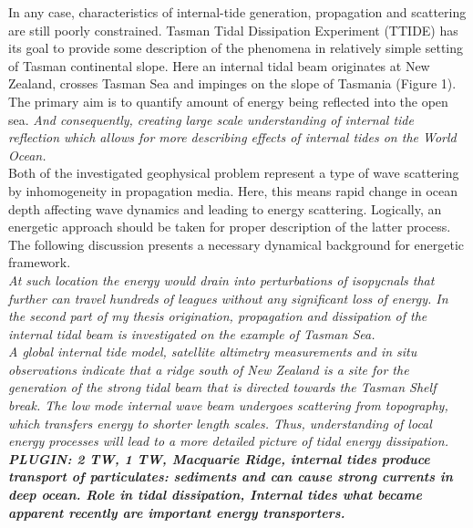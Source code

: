 In any case, characteristics of internal-tide generation, propagation and scattering are still poorly constrained. Tasman Tidal Dissipation Experiment (TTIDE) has its goal to provide some description of the phenomena in relatively simple setting of Tasman continental slope. Here an internal tidal beam originates at New Zealand, crosses Tasman Sea and impinges on the slope of Tasmania (Figure 1). The primary aim is to quantify amount of energy being reflected into the open sea.\textit{ And consequently, creating large scale understanding of internal tide reflection which allows for more describing effects of internal tides on the World Ocean.}\\
Both of the investigated geophysical problem represent a type of wave scattering by inhomogeneity in propagation media. Here, this means rapid change in ocean depth affecting wave dynamics and leading to energy scattering. Logically, an energetic approach should be taken for proper description of the latter process. The following discussion presents a  necessary dynamical background for energetic framework.\\
\textit{At such location the energy would drain into perturbations of isopycnals that further can travel hundreds of  leagues without any significant loss of energy. In the second part of my thesis origination, propagation and dissipation of the internal tidal beam is investigated on the example of Tasman Sea.\\
A global internal tide model, satellite altimetry measurements and in situ observations indicate that a ridge south of New Zealand is a site for the generation of the strong tidal beam that is directed towards the Tasman Shelf break. The low mode internal wave beam undergoes scattering from topography, which transfers energy to shorter length scales. Thus, understanding of local energy processes will lead to a more detailed picture of tidal energy dissipation.\\
\textbf{PLUGIN: 2 TW, 1 TW, Macquarie Ridge, internal tides produce transport of particulates: sediments and can cause strong currents in deep ocean. Role in tidal dissipation, Internal tides what became apparent recently are important energy transporters.}
}
\newpage
